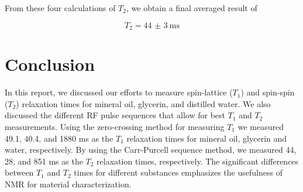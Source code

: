 \documentclass[
    floatfix,  %
    reprint,
    amsmath,
    amssymb,
    aps,
]{revtex4-2}
\begin{document}
From these four calculations of $T_2$, we obtain a final averaged result of

\begin{equation}
    T_2 = \SI[uncertainty-mode=separate]{44(3)}{\milli\second}
\end{equation}







\section{Conclusion}

In this report, we discussed our efforts to
measure spin-lattice ($T_1$) and spin-spin ($T_2$) relaxation
times for mineral oil, glycerin, and distilled water. We also discussed the different RF
pulse sequences that allow for best $T_1$ and $T_2$ measurements. Using the zero-crossing method for measuring $T_1$ we measured 49.1, 40.4, and 1880 ms as the $T_1$ relaxation times for mineral oil, glycerin and water, respectively. By using the Carr-Purcell sequence method, we measured 44, 28, and 851 ms as the $T_2$ relaxation times, respectively. The significant differences between $T_1$ and $T_2$ times for different substances emphasizes the usefulness of NMR for material characterization. 



























\nocite{*}
\end{document}
